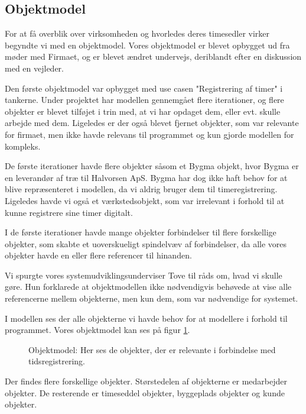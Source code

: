 \subsection{Objektmodel}

For at få overblik over virksomheden og hvorledes deres timesedler virker begyndte vi med en objektmodel.
Vores objektmodel er blevet opbygget ud fra møder med Firmaet, og er blevet ændret undervejs, deriblandt efter en diskussion med en vejleder.

Den første objektmodel var opbygget med use casen "Registrering af timer" i tankerne.
Under projektet har modellen gennemgået flere iterationer, og flere objekter er blevet tilføjet i trin med, at vi har opdaget dem, eller evt. skulle arbejde med dem.
Ligeledes er der også blevet fjernet objekter, som var relevante for firmaet, men ikke havde relevans til programmet og kun gjorde modellen for kompleks.

De første iterationer havde flere objekter såsom et Bygma objekt, hvor Bygma er en leverandør af træ til Halvorsen ApS.
Bygma har dog ikke haft behov for at blive repræsenteret i modellen, da vi aldrig bruger dem til timeregistrering.
Ligeledes havde vi også et værkstedsobjekt, som var irrelevant i forhold til at kunne registrere sine timer digitalt.

I de første iterationer havde mange objekter forbindelser til flere forskellige objekter, som skabte et uoverskueligt spindelvæv af forbindelser, da alle vores objekter havde en eller flere referencer til hinanden. 

Vi spurgte vores systemudviklingsunderviser Tove til råds om, hvad vi skulle gøre. Hun forklarede at objektmodellen ikke nødvendigvis behøvede at vise alle referencerne mellem objekterne, men kun dem, som var nødvendige for systemet.

I modellen ses der alle objekterne vi havde behov for at modellere i forhold til programmet.
Vores objektmodel kan ses på figur \ref{fig:Objektmodel}.

\begin{figure}[H]
    \caption{Objektmodel: Her ses de objekter, der er relevante i forbindelse med tidsregistrering.}
    \label{fig:Objektmodel}
\end{figure}

Der findes flere forskellige objekter. Størstedelen af objekterne er medarbejder objekter. De resterende er timeseddel objekter, byggeplads objekter og kunde objekter. 
